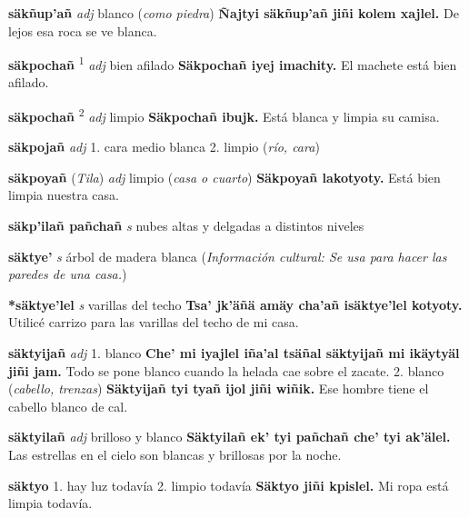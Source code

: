 \documentclass[10pt]{scrbook}
\newcommand{\entry}[1]{\textbf{#1}}
\newcommand{\onedefinition}[1]{#1.}
\newcommand{\defsuperscript}[1]{\textsuperscript{#1}}
\newcommand{\partofspeech}[1]{\textit{#1}}
\newcommand{\spanishtranslation}[1]{#1}
\newcommand{\clarification}[1]{(\textit{#1})}
\newcommand{\cholexample}[1]{\textbf{#1}}
\newcommand{\exampletranslation}[1]{#1}
\newcommand{\relevantdialect}[1]{(\textit{#1})}
\newcommand{\culturalinformation}[1]{(\textit{#1})}
\begin{document}
\begin{multicols}{2}
\entry{säkñup'añ}
\partofspeech{adj}
\spanishtranslation{blanco}
\clarification{como piedra}
\cholexample{Ñajtyi säkñup'añ jiñi kolem xajlel.}
\exampletranslation{De lejos esa roca se ve blanca.}

\entry{säkpochañ}
\defsuperscript{1}
\partofspeech{adj}
\spanishtranslation{bien afilado}
\cholexample{Säkpochañ iyej imachity.}
\exampletranslation{El machete está bien afilado.}

\entry{säkpochañ}
\defsuperscript{2}
\partofspeech{adj}
\spanishtranslation{limpio}
\cholexample{Säkpochañ ibujk.}
\exampletranslation{Está blanca y limpia su camisa.}

\entry{säkpojañ}
\partofspeech{adj}
\onedefinition{1}
\spanishtranslation{cara medio blanca}
\onedefinition{2}
\spanishtranslation{limpio}
\clarification{río, cara}

\entry{säkpoyañ}
\relevantdialect{Tila}
\partofspeech{adj}
\spanishtranslation{limpio}
\clarification{casa o cuarto}
\cholexample{Säkpoyañ lakotyoty.}
\exampletranslation{Está bien limpia nuestra casa.}

\entry{säkp'ilañ pañchañ}
\partofspeech{s}
\spanishtranslation{nubes altas y delgadas a distintos niveles}

\entry{säktye'}
\partofspeech{s}
\spanishtranslation{árbol de madera blanca}
\culturalinformation{Información cultural: Se usa para hacer las paredes de una casa.}

\entry{*säktye'lel}
\partofspeech{s}
\spanishtranslation{varillas del techo}
\cholexample{Tsa' jk'äñä amäy cha'añ isäktye'lel kotyoty.}
\exampletranslation{Utilicé carrizo para las varillas del techo de mi casa.}

\entry{säktyijañ}
\partofspeech{adj}
\onedefinition{1}
\spanishtranslation{blanco}
\cholexample{Che' mi iyajlel iña'al tsäñal säktyijañ mi ikäytyäl jiñi jam.}
\exampletranslation{Todo se pone blanco cuando la helada cae sobre el zacate.}
\onedefinition{2}
\spanishtranslation{blanco}
\clarification{cabello, trenzas}
\cholexample{Säktyijañ tyi tyañ ijol jiñi wiñik.}
\exampletranslation{Ese hombre tiene el cabello blanco de cal.}

\entry{säktyilañ}
\partofspeech{adj}
\spanishtranslation{brilloso y blanco}
\cholexample{Säktyilañ ek' tyi pañchañ che' tyi ak'älel.}
\exampletranslation{Las estrellas en el cielo son blancas y brillosas por la noche.}

\entry{säktyo}
\onedefinition{1}
\spanishtranslation{hay luz todavía}
\onedefinition{2}
\spanishtranslation{limpio todavía}
\cholexample{Säktyo jiñi kpislel.}
\exampletranslation{Mi ropa está limpia todavía.}


\end{multicols}
\end{document}
